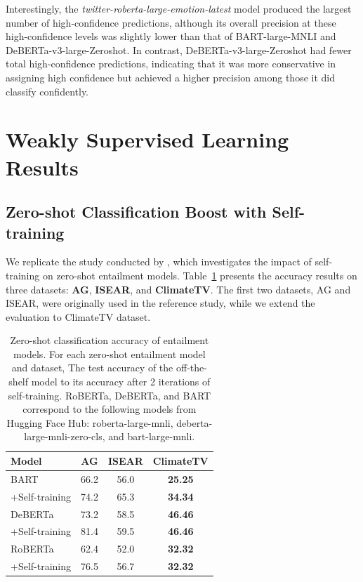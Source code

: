Interestingly, the \emph{twitter-roberta-large-emotion-latest} model produced the largest number of high-confidence predictions, although its overall precision at these high-confidence levels was slightly lower than that of BART-large-MNLI and DeBERTa-v3-large-Zeroshot. In contrast, DeBERTa-v3-large-Zeroshot had fewer total high-confidence predictions, indicating that it was more conservative in assigning high confidence but achieved a higher precision among those it did classify confidently.



\section{Weakly Supervised Learning Results}
\subsection{Zero-shot Classification Boost with Self-training}

We replicate the study conducted by \cite{gera_zero-shot_2022}, which investigates the impact of self-training on zero-shot entailment models. Table~\ref{tab:zero_shot} presents the accuracy results on three datasets: \textbf{AG}, \textbf{ISEAR}, and \textbf{ClimateTV}. The first two datasets, AG and ISEAR, were originally used in the reference study, while we extend the evaluation to ClimateTV dataset.

\begin{table}[h]
    \centering
    \begin{tabular}{lccc}
        \toprule
        Model & AG  & ISEAR & ClimateTV \\
        \midrule
        BART & 66.2 & 56.0 & \textbf{25.25} \\
        +Self-training & 74.2 & 65.3 & \textbf{34.34} \\
        \midrule
        DeBERTa & 73.2 & 58.5 & \textbf{46.46} \\
        +Self-training & 81.4 & 59.5 & \textbf{46.46} \\
        \midrule
        RoBERTa & 62.4 & 52.0 & \textbf{32.32} \\
        +Self-training & 76.5 & 56.7 & \textbf{32.32} \\
        \bottomrule
    \end{tabular}
    \caption{Zero-shot classification accuracy of entailment models. For each zero-shot entailment model and dataset, The test accuracy of the off-the-shelf model to its accuracy after 2 iterations of self-training. RoBERTa, DeBERTa, and BART correspond to the following models from Hugging Face Hub: roberta-large-mnli, deberta-large-mnli-zero-cls, and bart-large-mnli.}
    \label{tab:zero_shot}
\end{table}

